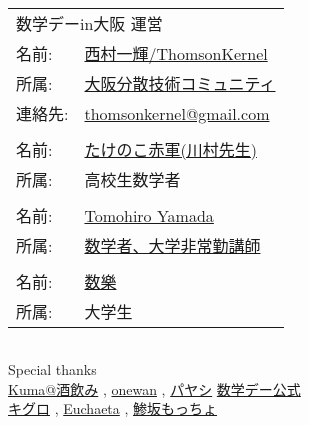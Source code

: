 \documentclass[b5paper,fleqn]{ltjsarticle}
\begin{document}
\newpage
\thispagestyle{empty}
\vspace*{\fill}
\begin{flushright}
\begin{minipage}{0.5\hsize}
  \begin{tabular}{|ll}
  \multicolumn{2}{|l}{数学デーin大阪 運営}\\[10pt]
  名前: &\href{https://twitter.com/ThomsonKernel}{西村一輝/ThomsonKernel}\\
  所属: &\href{https://sites.google.com/view/osaka-dtc}{大阪分散技術コミュニティ}\\
  連絡先: & \href{mailto:thomsonkernel@gmail.com}{thomsonkernel@gmail.com}\\
  \\
  名前: &\href{https://twitter.com/691_7758337633}{たけのこ赤軍(川村先生)}\\
  所属: &高校生数学者\\
  \\
  名前: &\href{https://twitter.com/tyamada1093}{Tomohiro Yamada}\\
  所属: &\href{https://kansai-lisp-useres.connpass.com}{数学者、大学非常勤講師}\\
  \\
  名前: &\href{https://twitter.com/coc_mathfun}{数樂}\\
  所属: &大学生
  \end{tabular}
  \begin{tabular}{l}
\end{tabular}\vskip15pt
Special thanks\\
   \href{https://twitter.com/notori48}{Kuma@酒飲み}
   , \href{https://twitter.com/ONEWAN}{onewan}
   , \href{https://twitter.com/Paya_payashi}{パヤシ}\vskip10pt
   \href{https://twitter.com/sugaku_day}{数学デー公式}\\
   \href{https://twitter.com/kiguro_masanao}{キグロ}
   , \href{https://twitter.com/euchaeta}{Euchaeta}
   , \href{https://twitter.com/motcho_tw}{鯵坂もっちょ}
\end{minipage}
\end{flushright}
\end{document}
